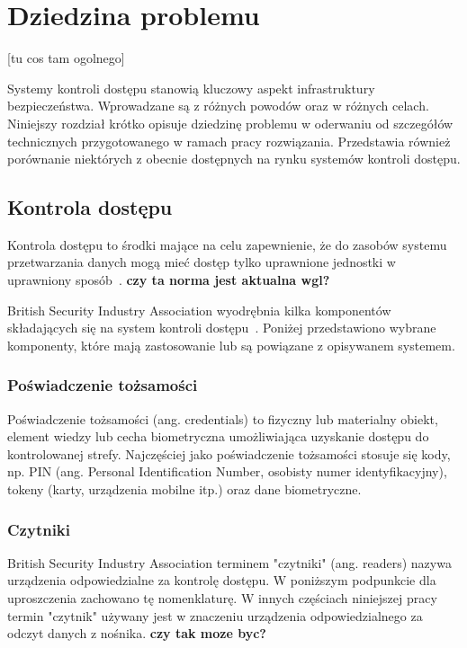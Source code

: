 \chapter{Dziedzina problemu}
\label{chap:problem-domain}
[tu cos tam ogolnego]

Systemy kontroli dostępu stanowią kluczowy aspekt infrastruktury bezpieczeństwa. Wprowadzane są z różnych powodów oraz w różnych celach. Niniejszy rozdział krótko opisuje dziedzinę problemu w oderwaniu od szczegółów technicznych przygotowanego w ramach pracy rozwiązania. Przedstawia również porównanie niektórych z obecnie dostępnych na rynku systemów kontroli dostępu.

\section{Kontrola dostępu}

Kontrola dostępu to środki mające na celu zapewnienie, że do zasobów systemu przetwarzania danych mogą mieć dostęp tylko uprawnione jednostki w uprawniony sposób~\cite{pkn2002}. \textbf{czy ta norma jest aktualna wgl?}

British Security Industry Association wyodrębnia kilka komponentów składających się na system kontroli dostępu~\cite{bsia2016}. Poniżej przedstawiono wybrane komponenty, które mają zastosowanie lub są powiązane z opisywanem systemem.

\subsection{Poświadczenie tożsamości}
Poświadczenie tożsamości (ang. credentials) to fizyczny lub materialny obiekt, element wiedzy lub cecha biometryczna umożliwiająca uzyskanie dostępu do kontrolowanej strefy. Najczęściej jako poświadczenie tożsamości stosuje się kody, np. PIN (ang. Personal Identification Number, osobisty numer identyfikacyjny), tokeny (karty, urządzenia mobilne itp.) oraz dane biometryczne.~\cite{bsia2016}

\subsection{Czytniki}
British Security Industry Association terminem "czytniki" (ang. readers) nazywa urządzenia odpowiedzialne za kontrolę dostępu. W poniższym podpunkcie dla uproszczenia zachowano tę nomenklaturę. W innych częściach niniejszej pracy termin "czytnik" używany jest w znaczeniu urządzenia odpowiedzialnego za odczyt danych z nośnika. \textbf{czy tak moze byc?}

